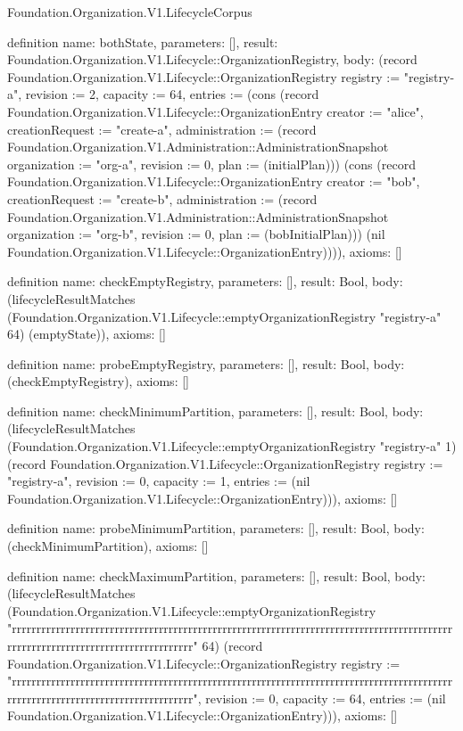 \begin{lexlean}{Foundation.Organization.V1.LifecycleCorpus}
\begin{semanticmodule}
definition{
  name: bothState,
  parameters: [],
  result: Foundation.Organization.V1.Lifecycle::OrganizationRegistry,
  body: (record Foundation.Organization.V1.Lifecycle::OrganizationRegistry {registry := "registry-a", revision := 2, capacity := 64, entries := (cons (record Foundation.Organization.V1.Lifecycle::OrganizationEntry {creator := "alice", creationRequest := "create-a", administration := (record Foundation.Organization.V1.Administration::AdministrationSnapshot {organization := "org-a", revision := 0, plan := (initialPlan)})}) (cons (record Foundation.Organization.V1.Lifecycle::OrganizationEntry {creator := "bob", creationRequest := "create-b", administration := (record Foundation.Organization.V1.Administration::AdministrationSnapshot {organization := "org-b", revision := 0, plan := (bobInitialPlan)})}) (nil Foundation.Organization.V1.Lifecycle::OrganizationEntry)))}),
  axioms: []
}

definition{
  name: checkEmptyRegistry,
  parameters: [],
  result: Bool,
  body: (lifecycleResultMatches (Foundation.Organization.V1.Lifecycle::emptyOrganizationRegistry "registry-a" 64) (emptyState)),
  axioms: []
}

definition{
  name: probeEmptyRegistry,
  parameters: [],
  result: Bool,
  body: (checkEmptyRegistry),
  axioms: []
}

definition{
  name: checkMinimumPartition,
  parameters: [],
  result: Bool,
  body: (lifecycleResultMatches (Foundation.Organization.V1.Lifecycle::emptyOrganizationRegistry "registry-a" 1) (record Foundation.Organization.V1.Lifecycle::OrganizationRegistry {registry := "registry-a", revision := 0, capacity := 1, entries := (nil Foundation.Organization.V1.Lifecycle::OrganizationEntry)})),
  axioms: []
}

definition{
  name: probeMinimumPartition,
  parameters: [],
  result: Bool,
  body: (checkMinimumPartition),
  axioms: []
}

definition{
  name: checkMaximumPartition,
  parameters: [],
  result: Bool,
  body: (lifecycleResultMatches (Foundation.Organization.V1.Lifecycle::emptyOrganizationRegistry "rrrrrrrrrrrrrrrrrrrrrrrrrrrrrrrrrrrrrrrrrrrrrrrrrrrrrrrrrrrrrrrrrrrrrrrrrrrrrrrrrrrrrrrrrrrrrrrrrrrrrrrrrrrrrrrrrrrrrrrrrrrrrrrr" 64) (record Foundation.Organization.V1.Lifecycle::OrganizationRegistry {registry := "rrrrrrrrrrrrrrrrrrrrrrrrrrrrrrrrrrrrrrrrrrrrrrrrrrrrrrrrrrrrrrrrrrrrrrrrrrrrrrrrrrrrrrrrrrrrrrrrrrrrrrrrrrrrrrrrrrrrrrrrrrrrrrrr", revision := 0, capacity := 64, entries := (nil Foundation.Organization.V1.Lifecycle::OrganizationEntry)})),
  axioms: []
}


\end{semanticmodule}
\end{lexlean}
